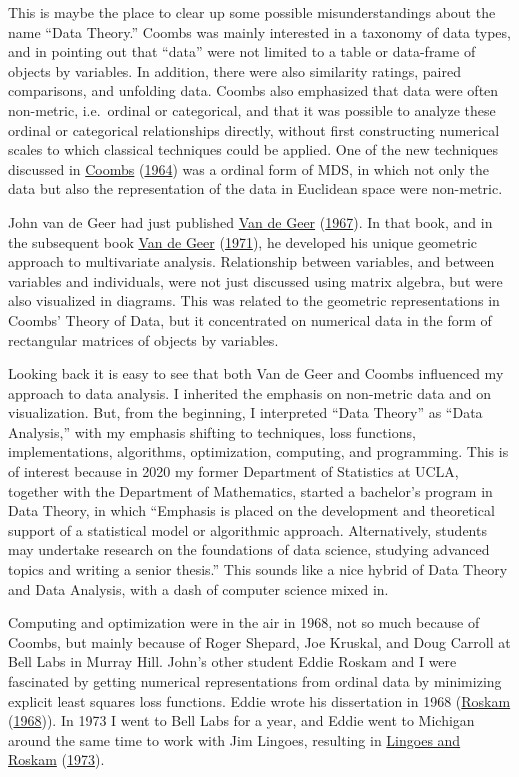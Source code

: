 \documentclass[
  12pt,
]{book}
\theoremstyle{definition}
\theoremstyle{definition}
\theoremstyle{definition}
\theoremstyle{definition}
\theoremstyle{remark}
\begin{document}
This is maybe the place to clear up some possible misunderstandings
about the name ``Data Theory.'' Coombs was mainly interested in a taxonomy
of data types, and in pointing out that ``data'' were not limited to a
table or data-frame of objects by variables. In addition, there were
also similarity ratings, paired comparisons, and unfolding data. Coombs
also emphasized that data were often non-metric, i.e.~ordinal or
categorical, and that it was possible to analyze these ordinal or
categorical relationships directly, without first constructing numerical
scales to which classical techniques could be applied. One of the new
techniques discussed in \protect\hyperlink{ref-coombs_64}{Coombs} (\protect\hyperlink{ref-coombs_64}{1964}) was a ordinal form of MDS, in
which not only the data but also the representation of the data in
Euclidean space were non-metric.

John van de Geer had just published \protect\hyperlink{ref-vandegeer_67}{Van de Geer} (\protect\hyperlink{ref-vandegeer_67}{1967}). In that book, and in
the subsequent book \protect\hyperlink{ref-vandegeer_71}{Van de Geer} (\protect\hyperlink{ref-vandegeer_71}{1971}), he developed his unique geometric
approach to multivariate analysis. Relationship between variables, and
between variables and individuals, were not just discussed using matrix
algebra, but were also visualized in diagrams. This was related to the
geometric representations in Coombs' Theory of Data, but it concentrated
on numerical data in the form of rectangular matrices of objects by variables.

Looking back it is easy to see that both Van de Geer and Coombs
influenced my approach to data analysis. I inherited the emphasis on
non-metric data and on visualization. But, from the beginning, I
interpreted ``Data Theory'' as ``Data Analysis,'' with my emphasis shifting
to techniques, loss functions, implementations,
algorithms, optimization, computing, and programming. This is of
interest because in 2020 my former Department of Statistics at UCLA,
together with the Department of Mathematics, started a bachelor's
program in Data Theory, in which ``Emphasis is placed on the development
and theoretical support of a statistical model or algorithmic approach.
Alternatively, students may undertake research on the foundations of
data science, studying advanced topics and writing a senior thesis.''
This sounds like a nice hybrid of Data Theory and Data Analysis, with a
dash of computer science mixed in.

Computing and optimization were in the air in 1968, not so much because
of Coombs, but mainly because of Roger Shepard, Joe Kruskal, and Doug
Carroll at Bell Labs in Murray Hill. John's other student Eddie Roskam
and I were fascinated by getting numerical representations from ordinal
data by minimizing explicit least squares loss functions. Eddie wrote
his dissertation in 1968 (\protect\hyperlink{ref-roskam_68}{Roskam} (\protect\hyperlink{ref-roskam_68}{1968})). In 1973 I went to Bell Labs for a
year, and Eddie went to Michigan around the same time to work with Jim
Lingoes, resulting in \protect\hyperlink{ref-lingoes_roskam_73}{Lingoes and Roskam} (\protect\hyperlink{ref-lingoes_roskam_73}{1973}).
\end{document}
